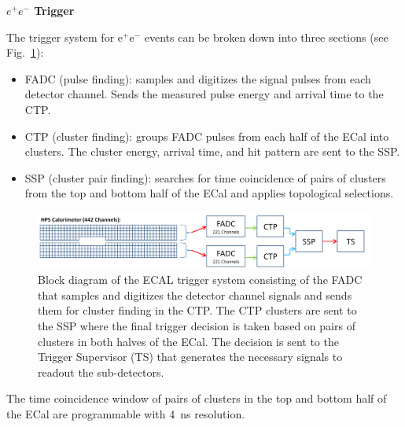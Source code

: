 \vspace{1cm}
{\bf $e^+e^-$ Trigger} 


The trigger system for e$^+$e$^-$ events can be broken down into three sections (see Fig.~\ref{fig:hps_trigger_cal}):
 \begin{itemize}
 \item FADC (pulse finding): samples and digitizes the signal pulses from each detector channel. Sends the measured pulse energy and arrival time to the CTP.
\item CTP (cluster finding): groups FADC pulses from each half of the ECal into clusters. The cluster energy, arrival time, and hit pattern are sent to the SSP.
 \item SSP (cluster pair finding): searches for time coincidence of pairs of clusters from the top and bottom half of the ECal and applies topological selections.
\end{itemize}
 \begin{figure}[t]
 \includegraphics[scale=0.25]{daq_trigger/figures/hps_trigger_cal}
\caption{\small{Block diagram of the ECAL trigger system consisting of the FADC that samples and digitizes the detector channel signals and sends them for cluster finding in the CTP. The CTP clusters are sent to the SSP where the final trigger decision is taken based on pairs of clusters in both halves of the ECal. The decision is sent to the Trigger Supervisor (TS) that generates the necessary signals to readout the sub-detectors.}}
 \label{fig:hps_trigger_cal}
 \end{figure}
The time coincidence window of pairs of clusters in the top and bottom half of the ECal are programmable with 4~ns resolution. 
